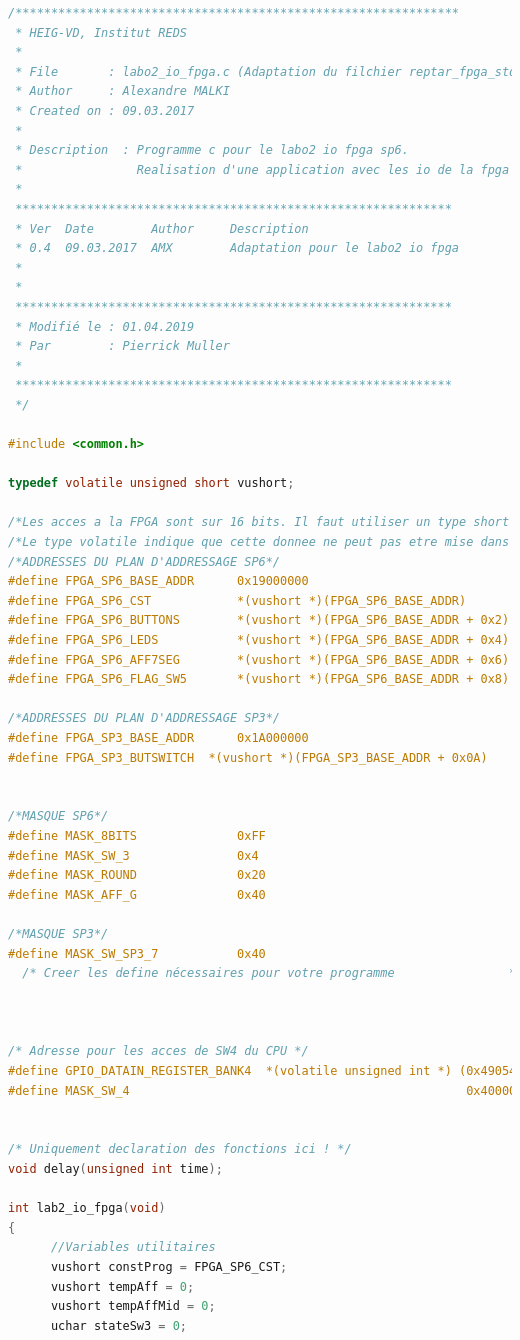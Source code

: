 \begin{lstlisting}[language=C]
/**************************************************************
 * HEIG-VD, Institut REDS
 *
 * File       : labo2_io_fpga.c (Adaptation du filchier reptar_fpga_std.c)
 * Author     : Alexandre MALKI
 * Created on : 09.03.2017
 *
 * Description  : Programme c pour le labo2 io fpga sp6.
 *                Realisation d'une application avec les io de la fpga
 *
 *************************************************************
 * Ver  Date        Author     Description
 * 0.4  09.03.2017  AMX        Adaptation pour le labo2 io fpga
 *
 *
 *************************************************************
 * Modifié le : 01.04.2019
 * Par        : Pierrick Muller
 *
 *************************************************************
 */

#include <common.h>

typedef volatile unsigned short vushort;

/*Les acces a la FPGA sont sur 16 bits. Il faut utiliser un type short */
/*Le type volatile indique que cette donnee ne peut pas etre mise dans le cash*/
/*ADDRESSES DU PLAN D'ADDRESSAGE SP6*/
#define FPGA_SP6_BASE_ADDR      0x19000000
#define FPGA_SP6_CST            *(vushort *)(FPGA_SP6_BASE_ADDR)
#define FPGA_SP6_BUTTONS        *(vushort *)(FPGA_SP6_BASE_ADDR + 0x2)
#define FPGA_SP6_LEDS           *(vushort *)(FPGA_SP6_BASE_ADDR + 0x4)
#define FPGA_SP6_AFF7SEG        *(vushort *)(FPGA_SP6_BASE_ADDR + 0x6)
#define FPGA_SP6_FLAG_SW5		*(vushort *)(FPGA_SP6_BASE_ADDR + 0x8)

/*ADDRESSES DU PLAN D'ADDRESSAGE SP3*/
#define FPGA_SP3_BASE_ADDR      0x1A000000
#define FPGA_SP3_BUTSWITCH 	*(vushort *)(FPGA_SP3_BASE_ADDR + 0x0A)


/*MASQUE SP6*/
#define MASK_8BITS              0xFF
#define MASK_SW_3               0x4
#define MASK_ROUND              0x20
#define MASK_AFF_G              0x40

/*MASQUE SP3*/
#define MASK_SW_SP3_7			0x40
  /* Creer les define nécessaires pour votre programme                */



/* Adresse pour les acces de SW4 du CPU */
#define GPIO_DATAIN_REGISTER_BANK4  *(volatile unsigned int *) (0x49054038)
#define MASK_SW_4                                               0x40000000


/* Uniquement declaration des fonctions ici ! */
void delay(unsigned int time);

int lab2_io_fpga(void)
{
	  //Variables utilitaires
      vushort constProg = FPGA_SP6_CST;
      vushort tempAff = 0;
      vushort tempAffMid = 0;
      uchar stateSw3 = 0;


\end{lstlisting}
